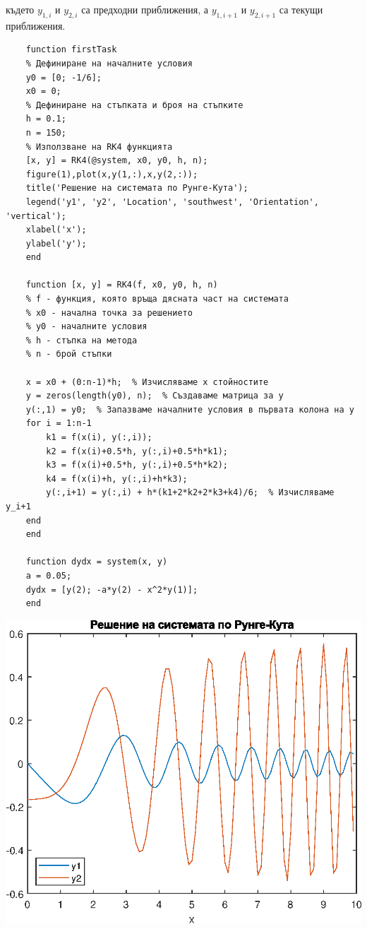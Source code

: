 \documentclass[a4paper,fleqn,12pt]{article}
\begin{document}
където $y_{1,i}$ и $y_{2,i}$ са предходни приближения, а $y_{1,i+1}$ и $y_{2,i+1}$ са текущи приближения. \\
	\newpage
	\begin{verbatim}
	function firstTask
	% Дефиниране на началните условия
	y0 = [0; -1/6];
	x0 = 0;
	% Дефиниране на стъпката и броя на стъпките
	h = 0.1;
	n = 150;
	% Използване на RK4 функцията
	[x, y] = RK4(@system, x0, y0, h, n);
	figure(1),plot(x,y(1,:),x,y(2,:));
	title('Решение на системата по Рунге-Кута');
	legend('y1', 'y2', 'Location', 'southwest', 'Orientation', 'vertical');
	xlabel('x');
	ylabel('y');
	end
	
	function [x, y] = RK4(f, x0, y0, h, n)
	% f - функция, която връща дясната част на системата
	% x0 - начална точка за решението
	% y0 - началните условия
	% h - стъпка на метода
	% n - брой стъпки
	
	x = x0 + (0:n-1)*h;  % Изчисляваме x стойностите
	y = zeros(length(y0), n);  % Създаваме матрица за y
	y(:,1) = y0;  % Запазваме началните условия в първата колона на y
	for i = 1:n-1
	    k1 = f(x(i), y(:,i));
	    k2 = f(x(i)+0.5*h, y(:,i)+0.5*h*k1);
	    k3 = f(x(i)+0.5*h, y(:,i)+0.5*h*k2);
	    k4 = f(x(i)+h, y(:,i)+h*k3);
	    y(:,i+1) = y(:,i) + h*(k1+2*k2+2*k3+k4)/6;  % Изчисляваме y_i+1
	end
	end
	
	function dydx = system(x, y)
	a = 0.05;
	dydx = [y(2); -a*y(2) - x^2*y(1)];
	end
	\end{verbatim}

\includegraphics{firstTask_01.eps}
\end{document}
